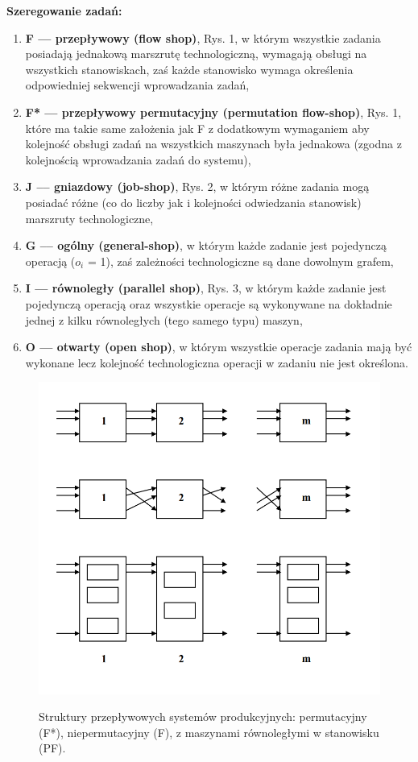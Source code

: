 \documentclass[10pt, a
4paper]{article}
\begin{document}
\noindent \textbf{Szeregowanie zadań:}
\begin{enumerate}
\item \textbf{F --- przepływowy (flow shop)}, Rys. 1, w którym wszystkie zadania posiadają jednakową marszrutę technologiczną, wymagają obsługi na
wszystkich stanowiskach, zaś każde stanowisko wymaga określenia odpowiedniej
sekwencji wprowadzania zadań,
\item \textbf{F* --- przepływowy permutacyjny (permutation flow-shop)}, Rys. 1, które ma takie same założenia jak F z dodatkowym wymaganiem aby kolejność
obsługi zadań na wszystkich maszynach była jednakowa (zgodna
z kolejnością wprowadzania zadań do systemu),
\item \textbf{J --– gniazdowy (job-shop)}, Rys. 2, w którym różne zadania mogą posiadać różne (co do liczby jak i kolejności odwiedzania stanowisk) marszruty
technologiczne,
\item \textbf{G –-- ogólny (general-shop)}, w którym każde zadanie jest pojedynczą operacją ($o_i$ = 1), zaś zależności technologiczne są dane dowolnym grafem,
\item \textbf{I --- równoległy (parallel shop)}, Rys. 3, w którym każde zadanie jest pojedynczą operacją oraz wszystkie operacje są wykonywane na dokładnie jednej z kilku równoległych (tego samego typu) maszyn,
\item \textbf{O --- otwarty (open shop)}, w którym wszystkie operacje zadania mają być wykonane lecz kolejność technologiczna operacji w zadaniu nie jest
określona.
\end{enumerate}

\begin{figure}[H]
\begin{center}
\label{diagram}
\includegraphics[scale = 0.5]{Rysunki/szeregowanie.png}
\caption{Struktury przepływowych systemów produkcyjnych: permutacyjny
(F*), niepermutacyjny (F), z maszynami równoległymi w stanowisku (PF).}
\end{center}
\end{figure}
\end{document}

